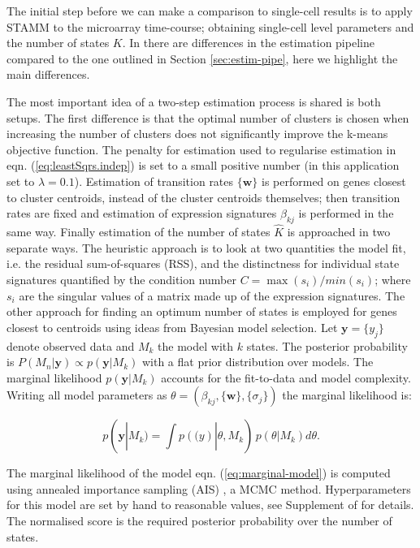 The initial step before we can make a comparison to single-cell results is to apply STAMM to the microarray time-course; obtaining single-cell level parameters and the number of states $K$. In  \cite{Armond:2013} there are differences in the estimation pipeline compared to the one outlined in Section \ref{sec:estim-pipe}, here we highlight the main differences.

The most important idea of a two-step estimation process is shared is both setups. The first difference is that the optimal number of clusters is chosen when increasing the number of clusters does not significantly improve the k-means objective function. The penalty for estimation used to regularise estimation in eqn. (\ref{eq:leastSqrs.indep}) is set to a small positive number (in this application set to $ \lambda = 0.1 $). Estimation of transition rates $\lbrace \mathbf{w} \rbrace $ is performed on genes closest to cluster centroids, instead of the cluster centroids themselves; then transition rates are fixed and estimation of expression signatures $\beta_{kj}$ is performed in the same way. Finally estimation of the number of states $\hat{K}$ is approached in two separate ways. The heuristic approach is to look at two quantities the model fit, i.e. the residual sum-of-squares (RSS), and the distinctness for individual state signatures quantified by the condition number $C = \max(s_i) / min(s_i)$; where $s_i$ are the singular values of a matrix made up of the expression signatures. The other approach for finding an optimum number of states is employed for genes closest to centroids using ideas from Bayesian model selection. Let $\mathbf{y} = \lbrace y_j \rbrace$ denote observed data and $M_k$ the model with $k$ states. The posterior probability is $P(M_n | \mathbf{y}) \propto p(\mathbf{y}|M_k) $ with a flat prior distribution over models. The marginal likelihood $p(\mathbf{y} | M_k)$ accounts for the fit-to-data and model complexity. Writing all model parameters as $\theta = (\beta_{kj}, \lbrace \mathbf{w} \rbrace, \lbrace \sigma_j \rbrace) $ the marginal likelihood is:

\begin{equation}
  \label{eq:marginal-model}
  p(\mathbf{y} | M_k) = \int p(\mathbf(y) | \theta, M_k)\, p(\theta | M_k) d\theta.
\end{equation}

The marginal likelihood of the model eqn. (\ref{eq:marginal-model}) is computed using annealed importance sampling (AIS) \citep{Neal:2001ed}, a MCMC method. Hyperparameters for this model are set by hand to reasonable values, see Supplement of \cite{Armond:2013} for details. The normalised score is the required posterior probability over the number of states. 

